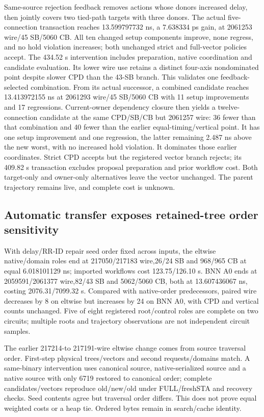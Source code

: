 \documentclass[conference,10pt]{IEEEtran}
\begin{document}
Same-source rejection feedback removes actions whose donors increased delay, then jointly covers two tied-path targets with three donors. The actual five-connection transaction reaches 13.599797732 ns, a 7.638334 ps gain, at 2061253 wire/45 SB/5060 CB. All ten changed setup components improve, none regress, and no hold violation increases; both unchanged strict and full-vector policies accept. The 434.52 s intervention includes preparation, native coordination and candidate evaluation. Its lower wire use retains a distinct four-axis nondominated point despite slower CPD than the 43-SB branch. This validates one feedback-selected combination. From its actual successor, a combined candidate reaches 13.413972155 ns at 2061293 wire/45 SB/5060 CB with 11 setup improvements and 17 regressions. Current-owner dependency closure then yields a twelve-connection candidate at the same CPD/SB/CB but 2061257 wire: 36 fewer than that combination and 40 fewer than the earlier equal-timing/vertical point. It has one setup improvement and one regression, the latter remaining 2.487 ns above the new worst, with no increased hold violation. It dominates those earlier coordinates. Strict CPD accepts but the registered vector branch rejects; its 409.82 s transaction excludes proposal preparation and prior workflow cost. Both target-only and owner-only alternatives leave the vector unchanged. The parent trajectory remains live, and complete cost is unknown.

\subsection{Automatic transfer exposes retained-tree order sensitivity}
With delay/RR-ID repair seed order fixed across inputs, the eltwise native/domain roles end at 217050/217183 wire,26/24 SB and 968/965 CB at equal 6.018101129 ns; imported workflows cost 123.75/126.10 s. BNN A0 ends at 2059591/2061377 wire,82/43 SB and 5062/5060 CB, both at 13.607436067 ns, costing 2076.31/7099.32 s. Compared with native-order predecessors, paired wire decreases by 8 on eltwise but increases by 24 on BNN A0, with CPD and vertical counts unchanged. Five of eight registered root/control roles are complete on two circuits; multiple roots and trajectory observations are not independent circuit samples.

The earlier 217214-to 217191-wire eltwise change comes from source traversal order. First-step physical trees/vectors and second requests/domains match. A same-binary intervention uses canonical source, native-serialized source and a native source with only 6719 restored to canonical order; complete candidates/vectors reproduce old/new/old under FULL/freshSTA and recovery checks. Seed contents agree but traversal order differs. This does not prove equal weighted costs or a heap tie. Ordered bytes remain in search/cache identity.
\end{document}
